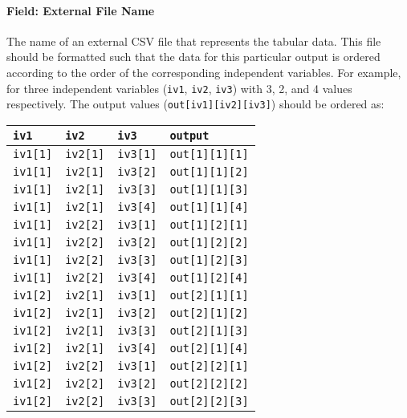 \paragraph{Field: External File
Name}\label{field-external-file-name}

The name of an external CSV file that represents the tabular data. This
file should be formatted such that the data for this particular output
is ordered according to the order of the corresponding independent
variables. For example, for three independent variables (\texttt{iv1},
\texttt{iv2}, \texttt{iv3}) with 3, 2, and 4 values respectively. The
output values (\texttt{out{[}iv1{]}{[}iv2{]}{[}iv3{]}}) should be
ordered as:

\begin{longtable}[]{@{}llll@{}}
\toprule
\texttt{iv1} & \texttt{iv2} & \texttt{iv3} &
\texttt{output}\tabularnewline
\midrule
\endhead
\texttt{iv1{[}1{]}} & \texttt{iv2{[}1{]}} & \texttt{iv3{[}1{]}} &
\texttt{out{[}1{]}{[}1{]}{[}1{]}}\tabularnewline
\texttt{iv1{[}1{]}} & \texttt{iv2{[}1{]}} & \texttt{iv3{[}2{]}} &
\texttt{out{[}1{]}{[}1{]}{[}2{]}}\tabularnewline
\texttt{iv1{[}1{]}} & \texttt{iv2{[}1{]}} & \texttt{iv3{[}3{]}} &
\texttt{out{[}1{]}{[}1{]}{[}3{]}}\tabularnewline
\texttt{iv1{[}1{]}} & \texttt{iv2{[}1{]}} & \texttt{iv3{[}4{]}} &
\texttt{out{[}1{]}{[}1{]}{[}4{]}}\tabularnewline
\texttt{iv1{[}1{]}} & \texttt{iv2{[}2{]}} & \texttt{iv3{[}1{]}} &
\texttt{out{[}1{]}{[}2{]}{[}1{]}}\tabularnewline
\texttt{iv1{[}1{]}} & \texttt{iv2{[}2{]}} & \texttt{iv3{[}2{]}} &
\texttt{out{[}1{]}{[}2{]}{[}2{]}}\tabularnewline
\texttt{iv1{[}1{]}} & \texttt{iv2{[}2{]}} & \texttt{iv3{[}3{]}} &
\texttt{out{[}1{]}{[}2{]}{[}3{]}}\tabularnewline
\texttt{iv1{[}1{]}} & \texttt{iv2{[}2{]}} & \texttt{iv3{[}4{]}} &
\texttt{out{[}1{]}{[}2{]}{[}4{]}}\tabularnewline
\texttt{iv1{[}2{]}} & \texttt{iv2{[}1{]}} & \texttt{iv3{[}1{]}} &
\texttt{out{[}2{]}{[}1{]}{[}1{]}}\tabularnewline
\texttt{iv1{[}2{]}} & \texttt{iv2{[}1{]}} & \texttt{iv3{[}2{]}} &
\texttt{out{[}2{]}{[}1{]}{[}2{]}}\tabularnewline
\texttt{iv1{[}2{]}} & \texttt{iv2{[}1{]}} & \texttt{iv3{[}3{]}} &
\texttt{out{[}2{]}{[}1{]}{[}3{]}}\tabularnewline
\texttt{iv1{[}2{]}} & \texttt{iv2{[}1{]}} & \texttt{iv3{[}4{]}} &
\texttt{out{[}2{]}{[}1{]}{[}4{]}}\tabularnewline
\texttt{iv1{[}2{]}} & \texttt{iv2{[}2{]}} & \texttt{iv3{[}1{]}} &
\texttt{out{[}2{]}{[}2{]}{[}1{]}}\tabularnewline
\texttt{iv1{[}2{]}} & \texttt{iv2{[}2{]}} & \texttt{iv3{[}2{]}} &
\texttt{out{[}2{]}{[}2{]}{[}2{]}}\tabularnewline
\texttt{iv1{[}2{]}} & \texttt{iv2{[}2{]}} & \texttt{iv3{[}3{]}} &
\texttt{out{[}2{]}{[}2{]}{[}3{]}}\tabularnewline

\end{longtable}
